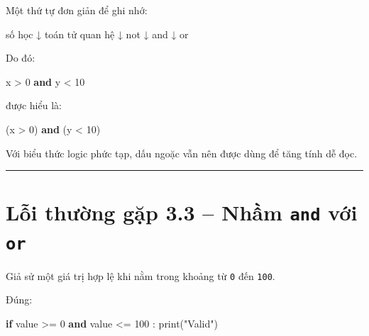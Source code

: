 \documentclass[
  11pt,
  a4paper,
]{article}
\newenvironment{Shaded}{}{}
\newcommand{\BuiltInTok}[1]{\textcolor[rgb]{0.00,0.50,0.00}{#1}}
\newcommand{\ControlFlowTok}[1]{\textcolor[rgb]{0.00,0.44,0.13}{\textbf{#1}}}
\newcommand{\DecValTok}[1]{\textcolor[rgb]{0.25,0.63,0.44}{#1}}
\newcommand{\KeywordTok}[1]{\textcolor[rgb]{0.00,0.44,0.13}{\textbf{#1}}}
\newcommand{\NormalTok}[1]{#1}
\newcommand{\OperatorTok}[1]{\textcolor[rgb]{0.40,0.40,0.40}{#1}}
\newcommand{\StringTok}[1]{\textcolor[rgb]{0.25,0.44,0.63}{#1}}
\begin{document}
Một thứ tự đơn giản để ghi nhớ:

\begin{Shaded}
\begin{Highlighting}[]
\NormalTok{số học}
\NormalTok{  ↓}
\NormalTok{toán tử quan hệ}
\NormalTok{  ↓}
\NormalTok{not}
\NormalTok{  ↓}
\NormalTok{and}
\NormalTok{  ↓}
\NormalTok{or}
\end{Highlighting}
\end{Shaded}

Do đó:

\begin{Shaded}
\begin{Highlighting}[]
\NormalTok{x }\OperatorTok{\textgreater{}} \DecValTok{0} \KeywordTok{and}\NormalTok{ y }\OperatorTok{\textless{}} \DecValTok{10}
\end{Highlighting}
\end{Shaded}

được hiểu là:

\begin{Shaded}
\begin{Highlighting}[]
\NormalTok{(x }\OperatorTok{\textgreater{}} \DecValTok{0}\NormalTok{) }\KeywordTok{and}\NormalTok{ (y }\OperatorTok{\textless{}} \DecValTok{10}\NormalTok{)}
\end{Highlighting}
\end{Shaded}

Với biểu thức logic phức tạp, dấu ngoặc vẫn nên được dùng để tăng tính
dễ đọc.

\begin{center}\rule{0.5\linewidth}{0.5pt}\end{center}

\section{\texorpdfstring{Lỗi thường gặp 3.3 -- Nhầm \texttt{and} với
\texttt{or}}{Lỗi thường gặp 3.3 -- Nhầm and với or}}\label{lux1ed7i-thux1b0ux1eddng-gux1eb7p-3.3-nhux1ea7m-and-vux1edbi-or}

Giả sử một giá trị hợp lệ khi nằm trong khoảng từ \texttt{0} đến
\texttt{100}.

Đúng:

\begin{Shaded}
\begin{Highlighting}[]
\ControlFlowTok{if}\NormalTok{ value }\OperatorTok{\textgreater{}=} \DecValTok{0} \KeywordTok{and}\NormalTok{ value }\OperatorTok{\textless{}=} \DecValTok{100}\NormalTok{ :}
    \BuiltInTok{print}\NormalTok{(}\StringTok{"Valid"}\NormalTok{)}
\end{Highlighting}
\end{Shaded}
\end{document}
